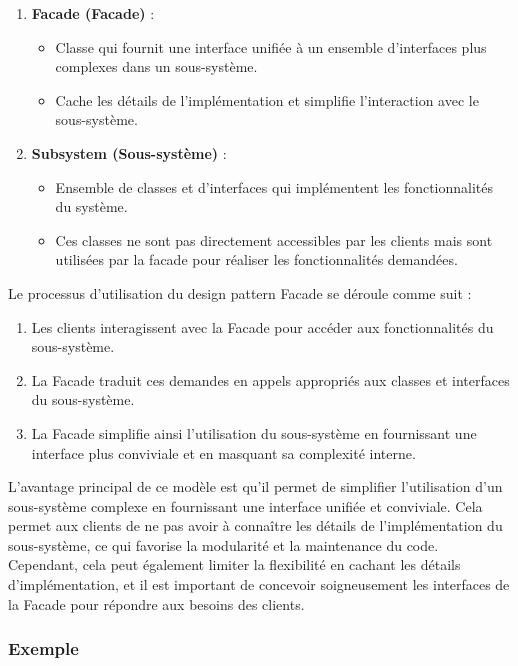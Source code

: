 \documentclass[french]{article}
\begin{document}
\begin{enumerate}
    \item \textbf{Facade (Facade)} :
    \begin{itemize}
        \item Classe qui fournit une interface unifiée à un ensemble d'interfaces plus complexes dans un sous-système.
        \item Cache les détails de l'implémentation et simplifie l'interaction avec le sous-système.
    \end{itemize}
    
    \item \textbf{Subsystem (Sous-système)} :
    \begin{itemize}
        \item Ensemble de classes et d'interfaces qui implémentent les fonctionnalités du système.
        \item Ces classes ne sont pas directement accessibles par les clients mais sont utilisées par la facade pour réaliser les fonctionnalités demandées.
    \end{itemize}
\end{enumerate}

Le processus d'utilisation du design pattern Facade se déroule comme suit :

\begin{enumerate}
    \item Les clients interagissent avec la Facade pour accéder aux fonctionnalités du sous-système.
    \item La Facade traduit ces demandes en appels appropriés aux classes et interfaces du sous-système.
    \item La Facade simplifie ainsi l'utilisation du sous-système en fournissant une interface plus conviviale et en masquant sa complexité interne.
\end{enumerate}

L'avantage principal de ce modèle est qu'il permet de simplifier l'utilisation d'un sous-système complexe en fournissant une interface unifiée et conviviale. Cela permet aux clients de ne pas avoir à connaître les détails de l'implémentation du sous-système, ce qui favorise la modularité et la maintenance du code. Cependant, cela peut également limiter la flexibilité en cachant les détails d'implémentation, et il est important de concevoir soigneusement les interfaces de la Facade pour répondre aux besoins des clients.


\subsubsection{Exemple}
\end{document}
